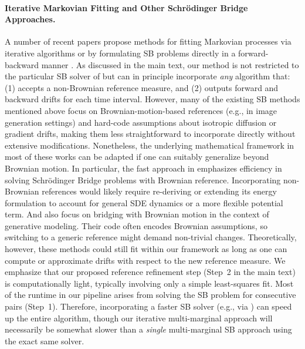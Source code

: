 \paragraph{Iterative Markovian Fitting and Other Schr\"odinger Bridge Approaches.} A number of recent papers propose methods for fitting Markovian processes via iterative algorithms or by formulating SB problems directly in a forward-backward manner \citep{peluchetti2023diffusion, shi2023diffusion, gushchin2024light, Vargas2021, wang2021deep, Caluya2022, gu2024partially}. As discussed in the main text, our method is not restricted to the particular SB solver of \citet{Vargas2021} but can in principle incorporate \emph{any} algorithm that: (1) accepts a non-Brownian reference measure, and (2) outputs forward and backward drifts for each time interval. However, many of the existing SB methods mentioned above focus on Brownian-motion-based references (e.g., in image generation settings) and hard-code assumptions about isotropic diffusion or gradient drifts, making them less straightforward to incorporate directly without extensive modifications. Nonetheless, the underlying mathematical framework in most of these works can be adapted if one can suitably generalize beyond Brownian motion. In particular, the fast approach in \citet{gushchin2024light} emphasizes efficiency in solving Schr\"odinger Bridge problems with Brownian reference. Incorporating non-Brownian references would likely require re-deriving or extending its energy formulation to account for general SDE dynamics or a more flexible potential term. And \citet{de2021diffusion, peluchetti2023diffusion} also focus on bridging with Brownian motion in the context of generative modeling. Their code often encodes Brownian assumptions, so switching to a generic reference might demand non-trivial changes. Theoretically, however, these methods could still fit within our framework as long as one can compute or approximate drifts with respect to the new reference measure. We emphasize that our proposed reference refinement step (Step~2 in the main text) is computationally light, typically involving only a simple least-squares fit. Most of the runtime in our pipeline arises from solving the SB problem for consecutive pairs (Step~1). Therefore, incorporating a faster SB solver (e.g., via \citet{gushchin2024light}) can speed up the entire algorithm, though our iterative multi-marginal approach will necessarily be somewhat slower than a \emph{single} multi-marginal SB approach using the exact same solver.

